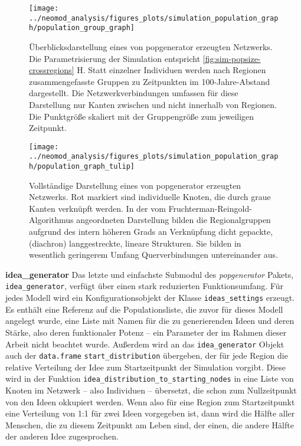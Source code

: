 \documentclass[openany,twoside,twocolumn]{book}
\begin{document}
\begin{landscape}
\begin{figure}[!t]

{\centering \texttt{[image: ../neomod\_analysis/figures\_plots/simulation\_population\_graph/population\_group\_graph]} 

}

\caption[Überblicksdarstellung eines von popgenerator erzeugten Netzwerks]{Überblicksdarstellung eines von popgenerator erzeugten Netzwerks. Die Parametrisierung der Simulation entspricht \ref{fig:sim-popsize-crossregions} H. Statt einzelner Individuen werden nach Regionen zusammengefasste Gruppen zu Zeitpunkten im 100-Jahre-Abstand dargestellt. Die Netzwerkverbindungen umfassen für diese Darstellung nur Kanten zwischen und nicht innerhalb von Regionen. Die Punktgröße skaliert mit der Gruppengröße zum jeweiligen Zeitpunkt.}\label{fig:group-graph}
\end{figure}
\end{landscape}

\begin{figure}
\texttt{[image: ../neomod\_analysis/figures\_plots/simulation\_population\_graph/population\_graph\_tulip]} \caption[Vollständige Darstellung eines von popgenerator erzeugten Netzwerks]{Vollständige Darstellung eines von popgenerator erzeugten Netzwerks. Rot markiert sind individuelle Knoten, die durch graue Kanten verknüpft werden. In der vom Fruchterman-Reingold-Algorithmus angeordneten Darstellung bilden die Regionalgruppen aufgrund des intern höheren Grads an Verknüpfung dicht gepackte, (diachron) langgestreckte, lineare Strukturen. Sie bilden in wesentlich geringerem Umfang Querverbindungen untereinander aus.}\label{fig:graph-tulip}
\end{figure}

\textbf{idea\_generator} \newline  Das letzte und einfachste Submodul
des \emph{popgenerator} Pakets, \texttt{idea\_generator}, verfügt über
einen stark reduzierten Funktionsumfang. Für jedes Modell wird ein
Konfigurationsobjekt der Klasse \texttt{ideas\_settings} erzeugt. Es
enthält eine Referenz auf die Populationsliste, die zuvor für dieses
Modell angelegt wurde, eine Liste mit Namen für die zu generierenden
Ideen und deren Stärke, also deren funktionaler Potenz -- ein Parameter
der im Rahmen dieser Arbeit nicht beachtet wurde. Außerdem wird an das
\texttt{idea\_generator} Objekt auch der \texttt{data.frame}
\texttt{start\_distribution} übergeben, der für jede Region die relative
Verteilung der Idee zum Startzeitpunkt der Simulation vorgibt. Diese
wird in der Funktion \texttt{idea\_distribution\_to\_starting\_nodes} in
eine Liste von Knoten im Netzwerk -- also Individuen -- übersetzt, die
schon zum Nullzeitpunkt von den Ideen okkupiert werden. Wenn also für
eine Region zum Startzeitpunkt eine Verteilung von 1:1 für zwei Ideen
vorgegeben ist, dann wird die Hälfte aller Menschen, die zu diesem
Zeitpunkt am Leben sind, der einen, die andere Hälfte der anderen Idee
zugesprochen.
\end{document}
